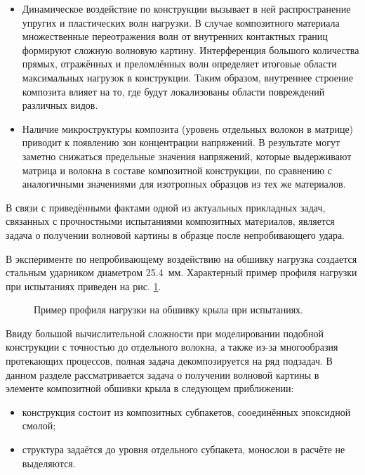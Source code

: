 \begin{itemize}

\item Динамическое воздействие по конструкции вызывает в ней распространение упругих и пластических волн 
нагрузки. В случае композитного материала множественные переотражения волн от внутренних контактных 
границ формируют сложную волновую картину. Интерференция большого количества 
прямых, отражённых и преломлённых волн определяет итоговые области максимальных нагрузок в конструкции. 
Таким образом, внутреннее строение композита влияет на то, где будут локализованы области 
повреждений различных видов.

\item Наличие микроструктуры композита (уровень отдельных волокон в матрице) приводит к появлению зон 
концентрации напряжений. В результате могут заметно снижаться предельные значения напряжений, которые 
выдерживают матрица и волокна в составе композитной конструкции, по сравнению с аналогичными значениями
для изотропных образцов из тех же материалов.

\end{itemize}

В связи с приведёнными фактами одной из актуальных прикладных задач, связанных с прочностными испытаниями 
композитных материалов, является задача о получении волновой картины в образце после
непробивающего удара. 

В эксперименте по непробивающему воздействию на обшивку нагрузка создается 
стальным ударником диаметром 25.4~мм. Характерный пример профиля нагрузки 
при испытаниях приведен на рис. \ref{pic:loadprofile}.
\begin{figure}[h]
\caption{Пример профиля нагрузки на обшивку крыла при испытаниях.}
\label{pic:loadprofile}
\end{figure}

Ввиду большой вычислительной сложности при моделировании подобной конструкции с 
точностью до отдельного волокна, а также из-за многообразия протекающих процессов, 
полная задача декомпозируется на ряд подзадач. В данном разделе рассматривается задача о получении
волновой картины в элементе композитной обшивки крыла в следующем приближении:
\begin{itemize}
\item конструкция состоит из композитных субпакетов, сооединённых эпоксидной смолой;
\item структура задаётся до уровня отдельного субпакета, монослои в расчёте не выделяются.
\end{itemize}

